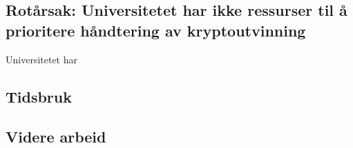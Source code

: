 \subsection{Rotårsak: Universitetet har ikke ressurser til å prioritere håndtering av kryptoutvinning}
Universitetet har 

\subsection{Tidsbruk}
\label{tidsbruk_case_3}


\subsection{Videre arbeid}




